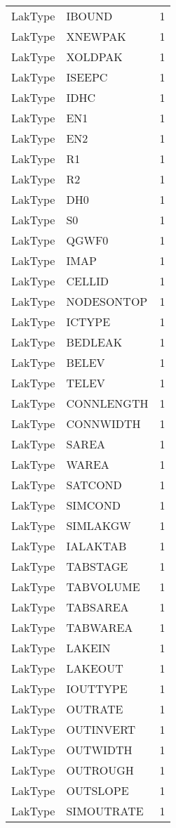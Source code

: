 \begin{longtable}{p{6cm} p{4cm} p{2cm} }
LakType &  IBOUND & 1 \\ 
LakType &  XNEWPAK & 1 \\ 
LakType &  XOLDPAK & 1 \\ 
LakType &  ISEEPC & 1 \\ 
LakType &  IDHC & 1 \\ 
LakType &  EN1 & 1 \\ 
LakType &  EN2 & 1 \\ 
LakType &  R1 & 1 \\ 
LakType &  R2 & 1 \\ 
LakType &  DH0 & 1 \\ 
LakType &  S0 & 1 \\ 
LakType &  QGWF0 & 1 \\ 
LakType &  IMAP & 1 \\ 
LakType &  CELLID & 1 \\ 
LakType &  NODESONTOP & 1 \\ 
LakType &  ICTYPE & 1 \\ 
LakType &  BEDLEAK & 1 \\ 
LakType &  BELEV & 1 \\ 
LakType &  TELEV & 1 \\ 
LakType &  CONNLENGTH & 1 \\ 
LakType &  CONNWIDTH & 1 \\ 
LakType &  SAREA & 1 \\ 
LakType &  WAREA & 1 \\ 
LakType &  SATCOND & 1 \\ 
LakType &  SIMCOND & 1 \\ 
LakType &  SIMLAKGW & 1 \\ 
LakType &  IALAKTAB & 1 \\ 
LakType &  TABSTAGE & 1 \\ 
LakType &  TABVOLUME & 1 \\ 
LakType &  TABSAREA & 1 \\ 
LakType &  TABWAREA & 1 \\ 
LakType &  LAKEIN & 1 \\ 
LakType &  LAKEOUT & 1 \\ 
LakType &  IOUTTYPE & 1 \\ 
LakType &  OUTRATE & 1 \\ 
LakType &  OUTINVERT & 1 \\ 
LakType &  OUTWIDTH & 1 \\ 
LakType &  OUTROUGH & 1 \\ 
LakType &  OUTSLOPE & 1 \\ 
LakType &  SIMOUTRATE & 1 \\ 

\end{longtable}
